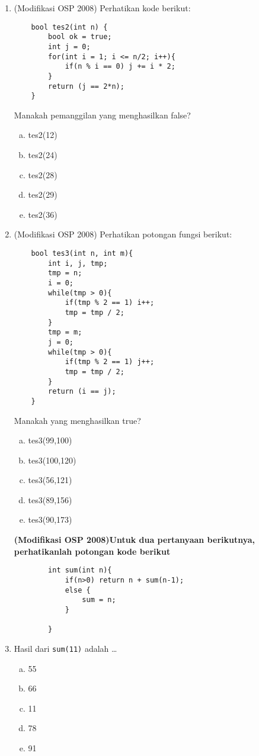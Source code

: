 \documentclass[11pt]{scrartcl}
\begin{document}
\begin{enumerate}
\item (Modifikasi OSP 2008) Perhatikan kode berikut:
	\begin{lstlisting}
	bool tes2(int n) {
		bool ok = true;
		int j = 0;
		for(int i = 1; i <= n/2; i++){
			if(n % i == 0) j += i * 2;
		}
		return (j == 2*n);
	}
	\end{lstlisting}
	Manakah pemanggilan yang menghasilkan false?
	\begin{enumerate}[a)]
	\item tes2(12)
	\item tes2(24)
	\item tes2(28)
	\item tes2(29)
	\item tes2(36)
	\end{enumerate}
	
	\item (Modifikasi OSP 2008) Perhatikan potongan fungsi berikut:
	\begin{lstlisting}
	bool tes3(int n, int m){
		int i, j, tmp;
		tmp = n;
		i = 0;
		while(tmp > 0){
			if(tmp % 2 == 1) i++;
			tmp = tmp / 2;
		}
		tmp = m;
		j = 0;
		while(tmp > 0){
			if(tmp % 2 == 1) j++;
			tmp = tmp / 2;
		}
		return (i == j);
	}
	\end{lstlisting}
	Manakah yang menghasilkan true?
	\begin{enumerate}[a)]
	\item tes3(99,100)
	\item tes3(100,120)
	\item tes3(56,121)
	\item tes3(89,156)
	\item tes3(90,173)
	\end{enumerate}
	
	\textbf{(Modifikasi OSP 2008)Untuk dua pertanyaan berikutnya, perhatikanlah potongan kode berikut}
		\begin{lstlisting}
		int sum(int n){
			if(n>0) return n + sum(n-1);
			else {
				sum = n;
			}
			
		}
		\end{lstlisting}
		\item Hasil dari \verb*|sum(11)| adalah \dots
		\begin{enumerate}[a)]
			\item 55
			\item 66
			\item 11
			\item 78
			\item 91
		\end{enumerate}
		

\end{enumerate}
\end{document}
